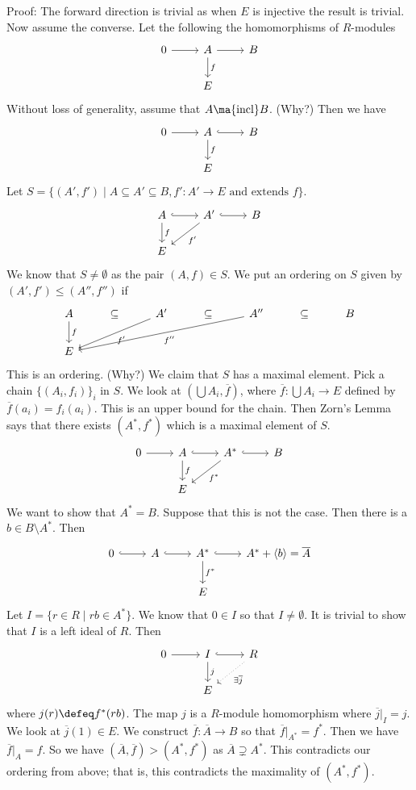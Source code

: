 Proof: The forward direction is trivial as when $E$ is injective the result is trivial. Now assume the converse. Let the following the homomorphisms of $R$-modules
\[
\begin{tikzcd}
0 \arrow{r} & A \arrow{r} \arrow{d}{f} & B  \\
& E & 
\end{tikzcd}
\]
Without loss of generality, assume that $A \ma{\text{incl}} B$. (Why?) Then we have
\[
\begin{tikzcd}
0 \arrow{r} & A \arrow[hook]{r} \arrow{d}{f} & B  \\
& E & 
\end{tikzcd}
\]
Let $S=\{(A',f') \;|\; A \subseteq A' \subseteq B, f':A' \rightarrow E \text{ and extends }f\}$. 
\[
\begin{tikzcd}
A \arrow[hook]{r} \arrow{d}{f} & A' \arrow[hook]{r} \arrow{dl}{f'} & B \\
E
\end{tikzcd}
\]
We know that $S \neq \emptyset$ as the pair $(A,f) \in S$. We put an ordering on $S$ given by $(A',f') \leq (A'',f'')$ if 
\[
\begin{tikzcd}
A \arrow{d}{f} & \subseteq & A' \arrow{dll}{f'} & \subseteq & A'' \arrow{dllll}{f''} & \subseteq & B \\
E & & & & & & 
\end{tikzcd}
\]
This is an ordering. (Why?) We claim that $S$ has a maximal element. Pick a chain $\{(A_i,f_i)\}_i$ in $S$. We look at $\left( \bigcup A_i,\overline{f}\right)$, where $\overline{f}: \bigcup A_i \rightarrow E$ defined by $\overline{f}(a_i)=f_i(a_i)$. This is an upper bound for the chain. Then Zorn's Lemma says that there exists $(A^*,f^*)$ which is a maximal element of $S$.
\[
\begin{tikzcd}
0 \arrow{r} & A \arrow[hook]{r} \arrow{d}{f} & A^* \arrow[hook]{r} \arrow{dl}{f^*} & B \\
& E & & 
\end{tikzcd}
\]
We want to show that $A^*=B$. Suppose that this is not the case. Then there is a $b \in B \setminus A^*$. Then
\[
\begin{tikzcd}
0 \arrow[hook]{r} & A \arrow[hook]{r} & A^* \arrow[hook]{r} \arrow{d}{f^*} & A^*+\langle b \rangle=\overline{A} \\
& & E & 
\end{tikzcd}
\]
Let $I=\{r \in R \;|\; rb \in A^*\}$. We know that $0 \in I$ so that $I \neq \emptyset$. It is trivial to show that $I$ is a left ideal of $R$. Then
\[
\begin{tikzcd}
0 \arrow{r} & I \arrow{d}{j} \arrow[hook]{r} & R \arrow[dotted]{dl}{\exists \overline{j}} \\
& E & 
\end{tikzcd}
\]
where $j(r) \defeq f^*(rb)$. The map $j$ is a $R$-module homomorphism where $\overline{j}|_I =j$. We look at $\overline{j}(1) \in E$. We construct $\overline{f}: \overline{A} \rightarrow B$ so that $\overline{f}|_{A^*} =f^*$. Then we have $\overline{f}|_A=f$. So we have $(\overline{A},\overline{f}) >(A^*,f^*)$ as $\overline{A} \supsetneq A^*$. This contradicts our ordering from above; that is, this contradicts the maximality of $(A^*,f^*)$.

